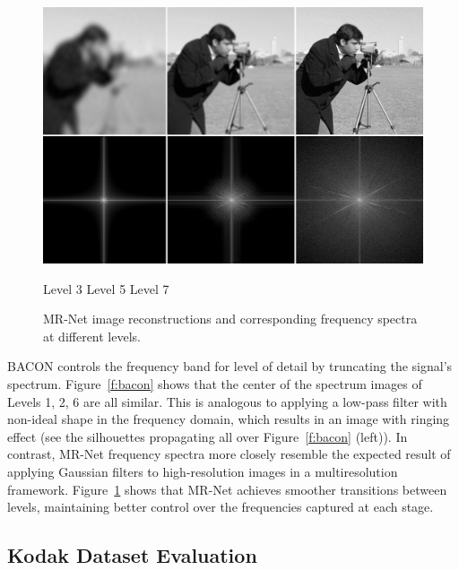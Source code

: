 \begin{figure}[!h]
\centering
\includegraphics[width=0.85\linewidth]{img/ch5/m-net-3.png}
\centerline{\small Level 3 \hfil Level 5 \hfil Level 7}
\caption{MR-Net image reconstructions and corresponding frequency spectra at different levels.}
\label{f:mnet}
\end{figure}


BACON controls the frequency band for level of detail by truncating the signal's spectrum. Figure~\ref{f:bacon} shows that the center of the spectrum images of Levels 1, 2, 6 are all similar. This is analogous to applying a low-pass filter with non-ideal shape in the frequency domain, which results in an image with ringing effect (see the silhouettes propagating all over Figure~\ref{f:bacon} (left)). In contrast, MR-Net frequency spectra more closely resemble the expected result of applying Gaussian filters to high-resolution images in a multiresolution framework. Figure~\ref{f:mnet} shows that MR-Net achieves smoother transitions between levels, maintaining better control over the frequencies captured at each stage.



\subsection{Kodak Dataset Evaluation}\label{sub:kodak}


